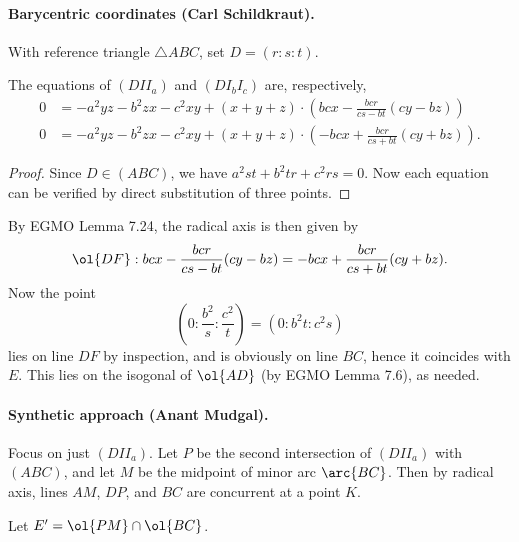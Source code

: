 \documentclass[11pt]{scrartcl}
\begin{document}
\paragraph{Barycentric coordinates (Carl Schildkraut).}
With reference triangle $\triangle ABC$, set $D = (r:s:t)$.
\begin{claim*}
  The equations of $(DII_a)$ and $(DI_bI_c)$ are, respectively,
  \begin{align*}
    0 &= -a^2yz-b^2zx-c^2xy + (x+y+z)
    \cdot \left( bc x - \frac{bcr}{cs-bt} (cy-bz) \right) \\
    0 &= -a^2yz-b^2zx-c^2xy + (x+y+z)
    \cdot \left( -bc x + \frac{bcr}{cs+bt} (cy+bz) \right).
  \end{align*}
\end{claim*}
\begin{proof}
  Since $D \in (ABC)$, we have $a^2st+b^2tr+c^2rs=0$.
  Now each equation can be verified by direct substitution of three points.
\end{proof}

By EGMO Lemma 7.24, the radical axis is then given by
\[ \ol{DF}: bc x - \frac{bcr}{cs-bt} (cy-bz)
    = -bc x + \frac{bcr}{cs+bt} (cy+bz). \]
Now the point
\[ \left( 0 : \frac{b^2}{s} : \frac{c^2}{t} \right)
  = \left( 0 : b^2t : c^2s \right) \]
lies on line $DF$ by inspection, and is obviously on line $BC$,
hence it coincides with $E$.
This lies on the isogonal of $\ol{AD}$ (by EGMO Lemma 7.6), as needed.

\paragraph{Synthetic approach (Anant Mudgal).}
Focus on just $(DII_a)$.
Let $P$ be the second intersection of $(DII_a)$ with $(ABC)$,
and let $M$ be the midpoint of minor arc $\arc{BC}$.
Then by radical axis, lines $AM$, $DP$, and $BC$ are concurrent at a point $K$.

Let $E' = \ol{PM} \cap \ol{BC}$.
\end{document}
